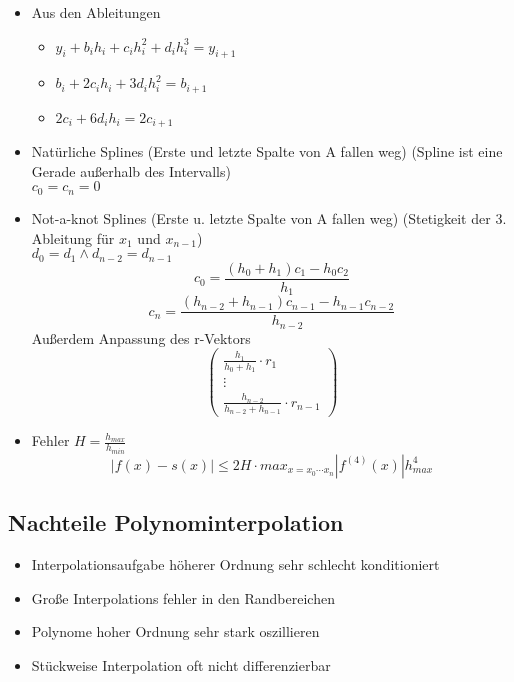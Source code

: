 \begin{itemize}
	\item Aus den Ableitungen
	\begin{itemize}
		\item $y_i + b_i h_i + c_i h_i^2 + d_i h_i^3 = y_{i+1}$
		\item $b_i + 2 c_i h_i + 3 d_i h_i^2 = b_{i+1}$
		\item $2 c_i + 6 d_i h_i = 2 c_{i+1}$
	\end{itemize}
	
	\item Natürliche Splines (Erste und letzte Spalte von A fallen weg)
	(Spline ist eine Gerade außerhalb des Intervalls) \\
	$c_0 = c_n = 0$
	
	\item Not-a-knot Splines (Erste u. letzte Spalte von A fallen weg)
	(Stetigkeit der 3. Ableitung für $x_1$ und $x_{n-1}$) \\
	$d_0 = d_1 \wedge d_{n-2} = d_{n-1}$ 
	\begin{equation*}
		c_0 = \frac{(h_0 + h_1)c_1 - h_0 c_2}{h_1}
	\end{equation*}
	\begin{equation*}
		c_n = \frac{(h_{n-2} + h_{n-1})c_{n-1} - h_{n-1} c_{n-2}}{h_{n-2}}
	\end{equation*}
	Außerdem Anpassung des r-Vektors
	\begin{displaymath}
		\begin{pmatrix}
			\frac{h_1}{h_0 + h_1} \cdot r_1 \\
			\vdots \\
			\frac{h_{n-2}}{h_{n-2} + h_{n-1}} \cdot r_{n-1}
		\end{pmatrix}
	\end{displaymath}
	
	\item Fehler $H = \frac{h_{max}}{h_{min}}$ \\
	\begin{equation*}
		|f(x)-s(x)| \leq 2H \cdot max_{x=x_0 \cdots x_n}|f^{(4)}(x)|h_{max}^4
	\end{equation*}
	
\end{itemize}

\subsection{Nachteile Polynominterpolation}
\begin{itemize}

	\item Interpolationsaufgabe höherer Ordnung sehr schlecht konditioniert

	\item Große Interpolations fehler in den Randbereichen
	
	\item Polynome hoher Ordnung sehr stark oszillieren
	
	\item Stückweise Interpolation oft nicht differenzierbar

\end{itemize}
